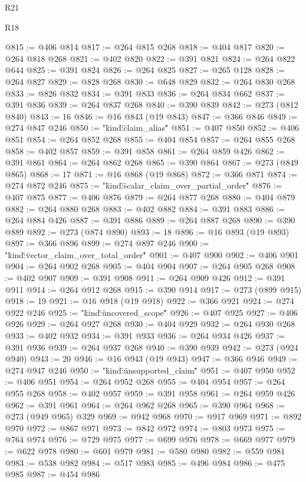 \begin{lexlean}{R21}
\begin{lexlean}{R18}
\begin{coremodule}
{{{{{{{{{{{{{{{{{{{{{{{{{{{{{{{{{{{{{{{{{{{{{{{{{{{{{{{{{{{{{{{{{{{{{{{{{{{{{{{{{{{{{{{{{{{{{{{{{{{{{{{{{{{{{{{{{{{{{{{{{{{{{{{{{{{{{{{{{{@815 := @406 @814
@817 := @264 @815 @268
@818 := @404 @817
@820 := @264 @818 @268
@821 := @402 @820
@822 := @391 @821
@824 := @264 @822 @644
@825 := @391 @824
@826 := @264 @825
@827 := @265 @128
@828 := @264 @827
@829 := @828 @268
@830 := @648 @829
@832 := @264 @830 @268
@833 := @826 @832
@834 := @391 @833
@836 := @264 @834 @662
@837 := @391 @836
@839 := @264 @837 @268
@840 := @390 @839
@842 := @273 (@812 @840)
@843 := 16
@846 := @16 @843 (@19 @843)
@847 := @366 @846
@849 := @274 @847 @246
@850 := "{\"kind\":\"claim_alias\""
@851 := @407 @850
@852 := @406 @851
@854 := @264 @852 @268
@855 := @404 @854
@857 := @264 @855 @268
@858 := @402 @857
@859 := @391 @858
@861 := @264 @859 @426
@862 := @391 @861
@864 := @264 @862 @268
@865 := @390 @864
@867 := @273 (@849 @865)
@868 := 17
@871 := @16 @868 (@19 @868)
@872 := @366 @871
@874 := @274 @872 @246
@875 := "{\"kind\":\"scalar_claim_over_partial_order\""
@876 := @407 @875
@877 := @406 @876
@879 := @264 @877 @268
@880 := @404 @879
@882 := @264 @880 @268
@883 := @402 @882
@884 := @391 @883
@886 := @264 @884 @426
@887 := @391 @886
@889 := @264 @887 @268
@890 := @390 @889
@892 := @273 (@874 @890)
@893 := 18
@896 := @16 @893 (@19 @893)
@897 := @366 @896
@899 := @274 @897 @246
@900 := "{\"kind\":\"vector_claim_over_total_order\""
@901 := @407 @900
@902 := @406 @901
@904 := @264 @902 @268
@905 := @404 @904
@907 := @264 @905 @268
@908 := @402 @907
@909 := @391 @908
@911 := @264 @909 @426
@912 := @391 @911
@914 := @264 @912 @268
@915 := @390 @914
@917 := @273 (@899 @915)
@918 := 19
@921 := @16 @918 (@19 @918)
@922 := @366 @921
@924 := @274 @922 @246
@925 := "{\"kind\":\"uncovered_scope\""
@926 := @407 @925
@927 := @406 @926
@929 := @264 @927 @268
@930 := @404 @929
@932 := @264 @930 @268
@933 := @402 @932
@934 := @391 @933
@936 := @264 @934 @426
@937 := @391 @936
@939 := @264 @937 @268
@940 := @390 @939
@942 := @273 (@924 @940)
@943 := 20
@946 := @16 @943 (@19 @943)
@947 := @366 @946
@949 := @274 @947 @246
@950 := "{\"kind\":\"unsupported_claim\""
@951 := @407 @950
@952 := @406 @951
@954 := @264 @952 @268
@955 := @404 @954
@957 := @264 @955 @268
@958 := @402 @957
@959 := @391 @958
@961 := @264 @959 @426
@962 := @391 @961
@964 := @264 @962 @268
@965 := @390 @964
@968 := @273 (@949 @965) @329
@969 := @942 @968
@970 := @917 @969
@971 := @892 @970
@972 := @867 @971
@973 := @842 @972
@974 := @803 @973
@975 := @764 @974
@976 := @729 @975
@977 := @699 @976
@978 := @669 @977
@979 := @622 @978
@980 := @601 @979
@981 := @580 @980
@982 := @559 @981
@983 := @538 @982
@984 := @517 @983
@985 := @496 @984
@986 := @475 @985
@987 := @454 @986
}}}}}}}}}}}}}}}}}}}}}}}}}}}}}}}}}}}}}}}}}}}}}}}}}}}}}}}}}}}}}}}}}}}}}}}}}}}}}}}}}}}}}}}}}}}}}}}}}}}}}}}}}}}}}}}}}}}}}}}}}}}}}}}}}}}}}}}}}}}}}}}
\end{coremodule}
\end{lexlean}
\end{lexlean}
